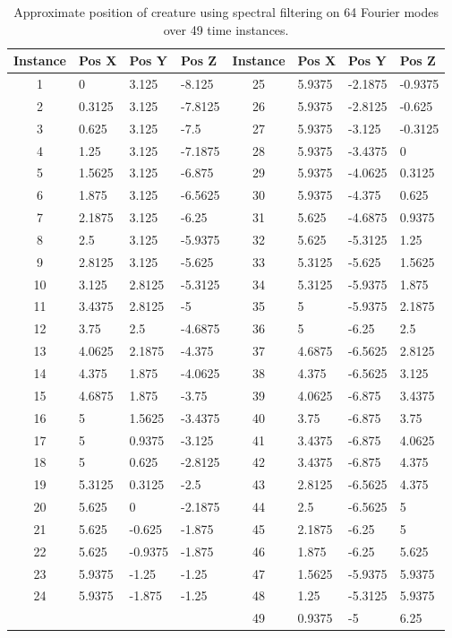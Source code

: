 \begin{table}
    \center
    \begin{tabular}{clll || clll}
        Instance & Pos X & Pos Y & Pos Z & Instance & Pos X & Pos Y & Pos Z \\ 
        \hline 
        1 & 0 & 3.125 & -8.125 & 25 & 5.9375 & -2.1875 & -0.9375 \\ 
        2 & 0.3125 & 3.125 & -7.8125 & 26 & 5.9375 & -2.8125 & -0.625 \\ 
        3 & 0.625 & 3.125 & -7.5 & 27 & 5.9375 & -3.125 & -0.3125 \\ 
        4 & 1.25 & 3.125 & -7.1875 & 28 & 5.9375 & -3.4375 & 0 \\
        5 & 1.5625 & 3.125 & -6.875 & 29 & 5.9375 & -4.0625 & 0.3125 \\  
        6 & 1.875 & 3.125 & -6.5625 & 30 & 5.9375 & -4.375 & 0.625 \\ 
        7 & 2.1875 & 3.125 & -6.25 & 31 & 5.625 & -4.6875 & 0.9375 \\ 
        8 & 2.5 & 3.125 & -5.9375 & 32 & 5.625 & -5.3125 & 1.25 \\ 
        9 & 2.8125 & 3.125 & -5.625 & 33 & 5.3125 & -5.625 & 1.5625 \\ 
        10 & 3.125 & 2.8125 & -5.3125 & 34 & 5.3125 & -5.9375 & 1.875 \\ 
        11 & 3.4375 & 2.8125 & -5 & 35 & 5 & -5.9375 & 2.1875 \\  
        12 & 3.75 & 2.5 & -4.6875 & 36 & 5 & -6.25 & 2.5 \\ 
        13 & 4.0625 & 2.1875 & -4.375 & 37 & 4.6875 & -6.5625 & 2.8125 \\ 
        14 & 4.375 & 1.875 & -4.0625 & 38 & 4.375 & -6.5625 & 3.125 \\
        15 & 4.6875 & 1.875 & -3.75 & 39 & 4.0625 & -6.875 & 3.4375 \\ 
        16 & 5 & 1.5625 & -3.4375 & 40 & 3.75 & -6.875 & 3.75 \\  
        17 & 5 & 0.9375 & -3.125 & 41 & 3.4375 & -6.875 & 4.0625 \\ 
        18 & 5 & 0.625 & -2.8125 & 42 & 3.4375 & -6.875 & 4.375 \\ 
        19 & 5.3125 & 0.3125 & -2.5 & 43 & 2.8125 & -6.5625 & 4.375 \\ 
        20 & 5.625 & 0 & -2.1875 & 44 & 2.5 & -6.5625 & 5 \\
        21 & 5.625 & -0.625 & -1.875 & 45 & 2.1875 & -6.25 & 5 \\
        22 & 5.625 & -0.9375 & -1.875 & 46 & 1.875 & -6.25 & 5.625 \\
        23 & 5.9375 & -1.25 & -1.25 & 47 & 1.5625 & -5.9375 & 5.9375 \\ 
        24 & 5.9375 & -1.875 & -1.25 & 48 & 1.25 & -5.3125 & 5.9375 \\ 
        & & & & 49 & 0.9375 & -5 & 6.25 \\ 
        \hline 
    \end{tabular}
    \caption{Approximate position of creature using spectral filtering on 64 Fourier modes over 49 time instances.}
\end{table}





